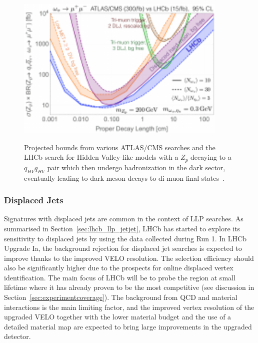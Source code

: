 \begin{figure}[t]
  \centering
  {\includegraphics[width=0.9\textwidth]{figures/ulhcb_darkmesons_dileptons.pdf}}
  \caption{Projected bounds from various ATLAS/CMS searches and the LHCb search for Hidden Valley-like models with a $Z_p$ decaying to a $q_{HV}q_{HV}$ pair which then undergo hadronization in the dark sector, eventually leading to dark meson decays to di-muon final states~\cite{Pierce:2017taw}.}
  \label{fig:ulhcb_hv_dimuons}
\end{figure}

\subsubsection{Displaced Jets}

Signatures with displaced jets are common in the context of LLP searches. As summarised in Section~\ref{sec:lhcb_llp_jetjet}, LHCb has started to explore its sensitivity to displaced jets by using the data collected during Run 1. In LHCb Upgrade Ia, the background rejection for displaced jet searches is expected to improve thanks to the improved VELO resolution. The selection efficiency should also be significantly higher due to the prospects for online displaced vertex identification. The main focus of LHCb will be to probe the region at small lifetime where it has already proven to be the most competitive (see discussion in Section~\ref{sec:experimentcoverage}). The background from QCD and material interactions is the main limiting factor, and the improved vertex resolution of the upgraded VELO together with the lower material budget and the use of a detailed material map are expected to bring large improvements in the upgraded detector.

